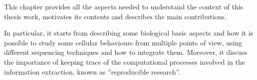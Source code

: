 This chapter provides all the aspects needed to understand the context of this thesis work, motivates its contents and describes the main contributions.

In particular, it starts from describing some biological basic aspects and how it is possible to study some cellular behaviours from multiple points of view, using different sequencing techniques and how to integrate them.
Moreover, it discuss the importance of keeping trace of the computational processes involved in the information extraction, known as ''reproducible research''.


